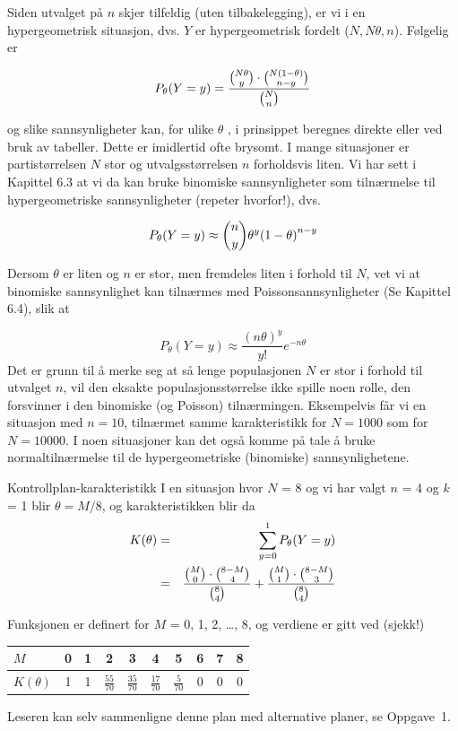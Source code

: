 Siden utvalget på $n$ skjer tilfeldig (uten tilbakelegging), er vi i en 
hypergeometrisk situasjon, dvs. $Y$ er hypergeometrisk fordelt ($N, N\theta ,
n$).  Følgelig er

\[  P_{\theta}(Y=y)=\frac{{{N\theta }\choose{y}} \cdot 
         {{N(1-\theta )}\choose{n-y}}}{{{N}\choose{n}}} \]

\noindent og slike sannsynligheter kan, for ulike $\theta$ , i prinsippet beregnes
direkte eller ved bruk av tabeller.  Dette er imidlertid ofte brysomt.
I mange situasjoner er partistørrelsen $N$ stor og utvalgsstørrelsen
$n$ forholdsvis liten.  Vi har sett i Kapittel 6.3 at vi da kan bruke
binomiske sannsynligheter som tilnærmelse til hypergeometriske
sannsynligheter (repeter hvorfor!), dvs.

\[  P_{\theta}(Y=y) \approx {{n}\choose{y}}{\theta}^y{(1-\theta )}^{n-y} \]

\noindent Dersom $\theta$ er liten og $n$ er stor, men fremdeles liten i forhold
til $N$, vet vi at binomiske sannsynlighet kan tilnærmes med
Poissonsannsynligheter (Se Kapittel 6.4), slik at 

\[  P_{\theta }(Y=y) \approx \frac{{(n\theta )}^y}{y!}e^{-n\theta} \]
Det er grunn til å merke seg at så lenge populasjonen $N$ er 
stor i forhold til utvalget $n$, vil den eksakte populasjonsstørrelse
ikke spille noen rolle, den forsvinner i den binomiske (og Poisson) 
tilnærmingen.  Eksempelvis får vi en situasjon med $n = 10$, 
tilnærmet samme karakteristikk for $N = 1000$ som for $N = 10000$.
I noen situasjoner kan det også komme på tale å bruke 
normaltilnærmelse til de hypergeometriske (binomiske) 
sannsynlighetene. \\

\begin{eksempel}{Kontrollplan-karakteristikk}
I en situasjon hvor $N$ = 8 og vi har valgt $n$ = 4 og $k$ = 1 blir
$\theta = M/8$, og karakteristikken blir da
\begin{eqnarray*}
K(\theta )&=&\sum_{y=0}^1 P_{\theta }(Y=y) \\
          &=&\frac{{{M}\choose{0}}\cdot {{8-M}\choose{4}}}{{{8}\choose{4}}}+
             \frac{{{M}\choose{1}}\cdot {{8-M}\choose{3}}}{{{8}\choose{4}}}
\end{eqnarray*}

\noindent Funksjonen er definert for $M$ = 0, 1, 2, \ldots, 8, og verdiene er
 gitt ved (sjekk!)

\begin{center}
\begin{tabular}{l|ccccccccc}
 $M$         & 0 & 1 & 2 & 3 & 4 & 5 & 6 & 7 & 8\\ \hline
$K(\theta )$ & 1 & 1 &$\frac{55}{70}$&$\frac{35}{70}$&$\frac{17}{70}$&
                       $\frac{5}{70}$& 0 & 0 & 0
\end{tabular}
\end{center}

\noindent Leseren kan selv sammenligne denne plan med alternative planer, se
Oppgave~1.\\
\end{eksempel}

